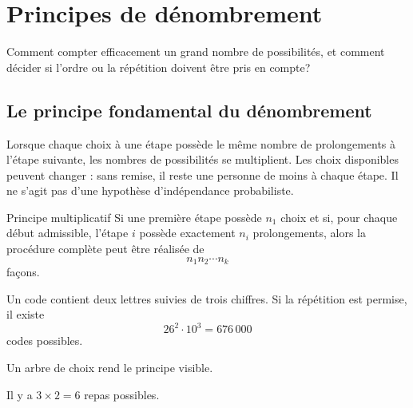 \chapter{Principes de dénombrement}
\label{manual:chapter:07}

\begin{questionbox}
Comment compter efficacement un grand nombre de possibilités, et comment décider si l'ordre ou la répétition doivent être pris en compte?
\end{questionbox}

\section{Le principe fondamental du dénombrement}
\label{manual:section:07.01}

\begin{intuitionbox}
Lorsque chaque choix à une étape possède le même nombre de prolongements à l'étape suivante, les nombres de possibilités se multiplient. Les choix disponibles peuvent changer : sans remise, il reste une personne de moins à chaque étape. Il ne s'agit pas d'une hypothèse d'indépendance probabiliste.
\end{intuitionbox}

\begin{theorem}{Principe multiplicatif}{}
Si une première étape possède \(n_1\) choix et si, pour chaque début admissible, l’étape \(i\) possède exactement \(n_i\) prolongements, alors la procédure complète peut être réalisée de
\[
n_1n_2\cdots n_k
\]
façons.
\end{theorem}

\begin{examplebox}
Un code contient deux lettres suivies de trois chiffres. Si la répétition est permise, il existe
\[
26^2\cdot10^3=676\,000
\]
codes possibles.
\end{examplebox}

Un arbre de choix rend le principe visible.

\begin{center}
\end{center}
Il y a $3\times2=6$ repas possibles.

